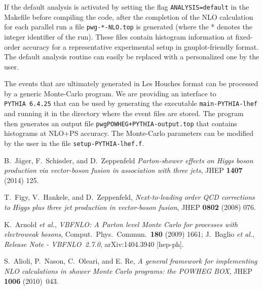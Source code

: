 \documentclass[a4paper,11pt]{article}
\newcommand\PYTHIA{{\tt PYTHIA}}
\begin{document}
If the default analysis is activated by setting the flag 
{\tt ANALYSIS=default} in the Makefile before compiling the code, after the completion of the NLO calculation for each parallel run a file {\tt  pwg-*-NLO.top} is generated (where the * denotes the integer
identifier of the run). These files contain histogram information at fixed-order accuracy for a representative experimental setup in gnuplot-friendly format. The default analysis routine can easily be replaced with a personalized one by the user.  

The events that are ultimately generated in Les Houches format can be processed by a generic Monte-Carlo program. We are providing an interface to \PYTHIA~{\tt 6.4.25} that can be used by generating the executable {\tt main-PYTHIA-lhef} and running it in the directory where the event files are stored. The program then generates an output file {\tt pwgPOWHEG+PYTHIA-output.top} that contains histograms at NLO+PS accuracy. The Monte-Carlo parameters can be modified by the user in the file {\tt setup-PYTHIA-lhef.f}. 

%
\begin{thebibliography}{99}

 B.~J\"ager, F.~Schissler, and D.~Zeppenfeld {\em Parton-shower effects on Higgs boson production via vector-boson fusion in association with three jets}, 
JHEP {\bf 1407} (2014) 125. 

  T.~Figy, V.~Hankele, and D.~Zeppenfeld,
  {\em Next-to-leading order QCD corrections to Higgs plus three jet production in vector-boson fusion},
  JHEP {\bf 0802} (2008) 076.
  
  K.~Arnold {\it et al.},
 {\em VBFNLO: A Parton level Monte Carlo for processes with electroweak bosons},
  Comput.\ Phys.\ Commun.\  {\bf 180} (2009) 1661;  
J.~Baglio {\it et al.},
  {\em Release Note - VBFNLO~2.7.0},
  arXiv:1404.3940 [hep-ph].

 S.~Alioli, P.~Nason, C.~Oleari, and E. Re, {\em
    A general framework for implementing NLO calculations in shower
    Monte Carlo programs: the POWHEG BOX}, JHEP {\bf 1006} (2010)~043. %

\end{thebibliography}
\end{document}
